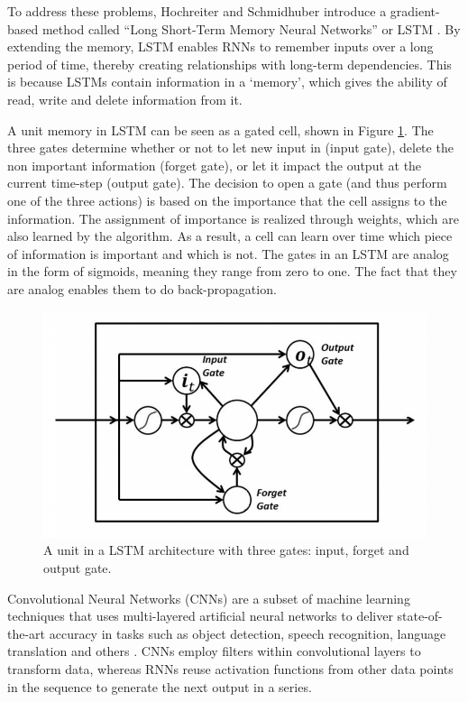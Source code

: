 To address these problems, Hochreiter and Schmidhuber introduce a gradient-based method called ``Long Short-Term Memory Neural Networks'' or LSTM \cite{HochSchm1997}. By extending the memory, LSTM enables RNNs to remember inputs over a long period of time, thereby creating relationships with long-term dependencies. This is because LSTMs contain information in a `memory', which gives the ability of read, write and delete information from it.

A unit memory in LSTM can be seen as a gated cell, shown in Figure \ref{Fig:LSTM-Unit}. The three gates determine whether or not to let new input in (input gate), delete the non important information (forget gate), or let it impact the output at the current time-step (output gate). The decision to open a gate (and thus perform one of the three actions) is based on the importance that the cell assigns to the information. The assignment of importance is realized through weights, which are also learned by the algorithm. As a result, a cell can learn over time which piece of information is important and which is not. The gates in an LSTM are analog in the form of sigmoids, meaning they range from zero to one. The fact that they are analog enables them to do back-propagation.

\begin{figure}[htb]
	\centering
	\includegraphics[scale=0.4]{../Figures/rnn-three-gates}
	\caption{A unit in a LSTM architecture with three gates: input, forget and output gate. }
	\label{Fig:LSTM-Unit}
\end{figure}

Convolutional Neural Networks (CNNs) \cite{Lecun1989} are a subset of machine learning techniques that uses multi-layered artificial neural networks to deliver state-of-the-art accuracy in tasks such as object detection, speech recognition, language translation and others \cite{Szegedy2013}. CNNs employ filters within convolutional layers to transform data, whereas RNNs reuse activation functions from other data points in the sequence to generate the next output in a series. 

